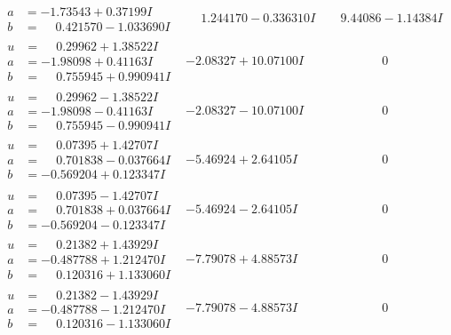 \documentclass[1p]{elsarticle_modified}
\theoremstyle{definition}
\begin{document}
$$\begin{array}{c|c|c}
\begin{aligned}
a &= -1.73543 + 0.37199 I \\
b &= \phantom{-}0.421570 - 1.033690 I\end{aligned}
 & \phantom{-}1.244170 - 0.336310 I & \phantom{-}9.44086 - 1.14384 I \\ \hline\begin{aligned}
u &= \phantom{-}0.29962 + 1.38522 I \\
a &= -1.98098 + 0.41163 I \\
b &= \phantom{-}0.755945 + 0.990941 I\end{aligned}
 & -2.08327 + 10.07100 I & \phantom{-0.000000 } 0 \\ \hline\begin{aligned}
u &= \phantom{-}0.29962 - 1.38522 I \\
a &= -1.98098 - 0.41163 I \\
b &= \phantom{-}0.755945 - 0.990941 I\end{aligned}
 & -2.08327 - 10.07100 I & \phantom{-0.000000 } 0 \\ \hline\begin{aligned}
u &= \phantom{-}0.07395 + 1.42707 I \\
a &= \phantom{-}0.701838 - 0.037664 I \\
b &= -0.569204 + 0.123347 I\end{aligned}
 & -5.46924 + 2.64105 I & \phantom{-0.000000 } 0 \\ \hline\begin{aligned}
u &= \phantom{-}0.07395 - 1.42707 I \\
a &= \phantom{-}0.701838 + 0.037664 I \\
b &= -0.569204 - 0.123347 I\end{aligned}
 & -5.46924 - 2.64105 I & \phantom{-0.000000 } 0 \\ \hline\begin{aligned}
u &= \phantom{-}0.21382 + 1.43929 I \\
a &= -0.487788 + 1.212470 I \\
b &= \phantom{-}0.120316 + 1.133060 I\end{aligned}
 & -7.79078 + 4.88573 I & \phantom{-0.000000 } 0 \\ \hline\begin{aligned}
u &= \phantom{-}0.21382 - 1.43929 I \\
a &= -0.487788 - 1.212470 I \\
b &= \phantom{-}0.120316 - 1.133060 I\end{aligned}
 & -7.79078 - 4.88573 I & \phantom{-0.000000 } 0\\

\end{array}$$
\end{document}
